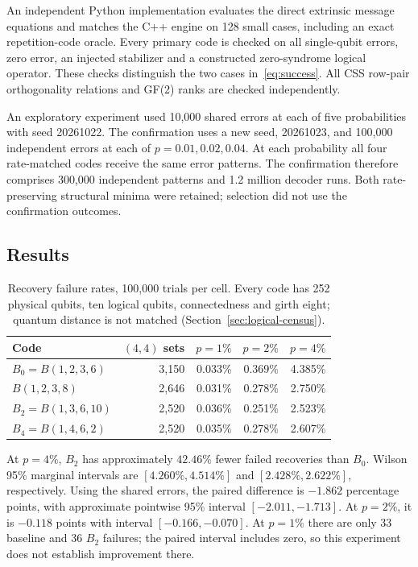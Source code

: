 \documentclass[11pt]{article}
\theoremstyle{definition}
\theoremstyle{remark}
\begin{document}
An independent Python implementation evaluates the direct extrinsic
message equations and matches the C++ engine on 128 small cases,
including an exact repetition-code oracle. Every primary code is checked
on all single-qubit errors, zero error, an injected stabilizer and a
constructed zero-syndrome logical operator. These checks distinguish
the two cases in~\eqref{eq:success}. All CSS row-pair orthogonality
relations and GF(2) ranks are checked independently.

An exploratory experiment used 10,000 shared errors at each of five
probabilities with seed 20261022. The confirmation uses a new seed,
20261023, and 100,000 independent errors at each of
$p=0.01,0.02,0.04$. At each probability all four rate-matched codes
receive the same error patterns. The confirmation therefore comprises
300,000 independent patterns and 1.2 million decoder runs. Both
rate-preserving structural minima were retained; selection did not use
the confirmation outcomes.

\subsection{Results}
\begin{table}[ht]
\centering\small
\begin{tabular}{lrrrr}
\toprule
Code & $(4,4)$ sets & $p=1\%$ & $p=2\%$ & $p=4\%$ \\
\midrule
$B_0=B(1,2,3,6)$ & 3,150 & 0.033\% & 0.369\% & 4.385\% \\
$B(1,2,3,8)$ & 2,646 & 0.031\% & 0.278\% & 2.750\% \\
$B_2=B(1,3,6,10)$ & 2,520 & 0.036\% & 0.251\% & 2.523\% \\
$B_4=B(1,4,6,2)$ & 2,520 & 0.035\% & 0.278\% & 2.607\% \\
\bottomrule
\end{tabular}
\caption{Recovery failure rates, 100,000 trials per cell. Every code
has 252 physical qubits, ten logical qubits, connectedness and girth eight;
quantum distance is not matched (Section~\ref{sec:logical-census}).}
\label{tab:decoding}
\end{table}

At $p=4\%$, $B_2$ has approximately $42.46\%$ fewer failed recoveries
than $B_0$. Wilson 95\% marginal intervals are
$[4.260\%,4.514\%]$ and $[2.428\%,2.622\%]$, respectively.
Using the shared errors, the paired difference is $-1.862$ percentage
points, with approximate pointwise 95\% interval
$[-2.011,-1.713]$. At $p=2\%$, it is $-0.118$ points with interval
$[-0.166,-0.070]$. At $p=1\%$ there are only 33 baseline and 36
$B_2$ failures; the paired interval includes zero, so this experiment
does not establish improvement there.
\end{document}
